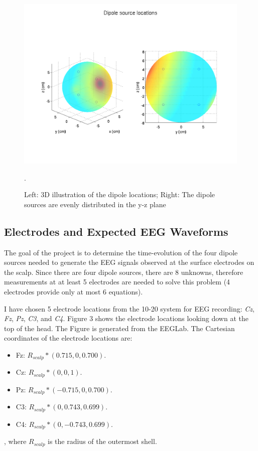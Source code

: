 \documentclass{article}
\begin{document}
\begin{figure}
    \begin{center}
        \includegraphics[scale=0.5]{dipole_sources.png}
        \caption{Left: 3D illustration of the dipole locations; Right: The dipole sources are evenly distributed in the y-z plane}.
    \end{center}
\end{figure}

\subsection{Electrodes and Expected EEG Waveforms}
The goal of the project is to determine the time-evolution of the four dipole sources needed to generate the EEG signals observed at the surface electrodes on the scalp. Since there are four dipole sources, there are 8 unknowns, therefore measurements at at least 5 electrodes are needed to solve this problem (4 electrodes provide only at most 6 equations).

I have chosen 5 electrode locations from the 10-20 system for EEG recording: \emph{Cz}, \emph{Fz}, \emph{Pz}, \emph{C3}, and \emph{C4}. Figure 3 shows the electrode locations looking down at the top of the head. The Figure is generated from the EEGLab\cite{EEGLab}. The Cartesian coordinates of the electrode locations are:
\begin{itemize}
    \item Fz: $R_{scalp}*(0.715,0,0.700)$.
    \item Cz: $R_{scalp}*(0,0,1)$.
    \item Pz: $R_{scalp}*(-0.715,0,0.700)$.
    \item C3: $R_{scalp}*(0,0.743,0.699)$.
    \item C4: $R_{scalp}*(0,-0.743,0.699)$.
\end{itemize}
, where $R_{scalp}$ is the radius of the outermost shell.
\end{document}
